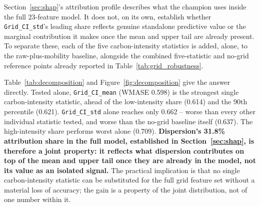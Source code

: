 \documentclass[preprint,12pt]{elsarticle}
\begin{document}
Section~\ref{sec:shap}'s attribution profile describes what the champion uses inside the full 23-feature model. It does not, on its own, establish whether \texttt{Grid\_CI\_std}'s leading share reflects genuine standalone predictive value or the marginal contribution it makes once the mean and upper tail are already present. To separate these, each of the five carbon-intensity statistics is added, alone, to the raw-plus-mobility baseline, alongside the combined five-statistic and no-grid reference points already reported in Table~\ref{tab:grid_robustness}.

Table~\ref{tab:decomposition} and Figure~\ref{fig:decomposition} give the answer directly. Tested alone, \texttt{Grid\_CI\_mean} (WMASE 0.598) is the strongest single carbon-intensity statistic, ahead of the low-intensity share (0.614) and the 90th percentile (0.621). \texttt{Grid\_CI\_std} alone reaches only 0.662 -- worse than every other individual statistic tested, and worse than the no-grid baseline itself (0.637). The high-intensity share performs worst alone (0.709). \textbf{Dispersion's 31.8\% attribution share in the full model, established in Section~\ref{sec:shap}, is therefore a joint property: it reflects what dispersion contributes on top of the mean and upper tail once they are already in the model, not its value as an isolated signal.} The practical implication is that no single carbon-intensity statistic can be substituted for the full grid feature set without a material loss of accuracy; the gain is a property of the joint distribution, not of one number within it.
\end{document}
